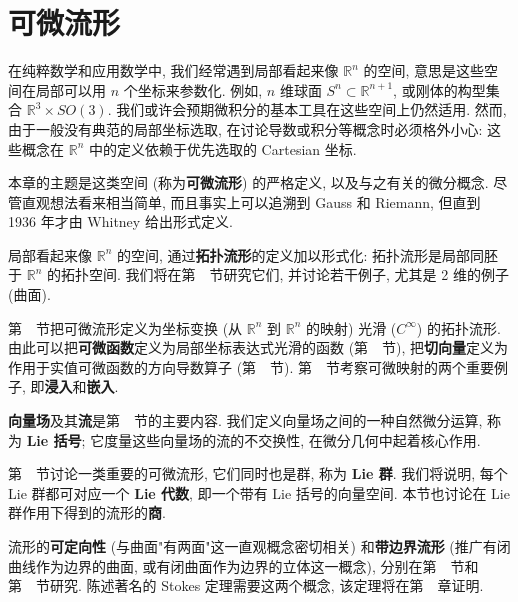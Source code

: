 \chapter{可微流形}\label{chap:differentiable-manifolds}
\begingroup
\renewcommand{\thefootnote}{}
\endgroup

在纯粹数学和应用数学中, 我们经常遇到局部看起来像 $\mathbb{R}^n$ 的空间, 意思是这些空间在局部可以用 $n$ 个坐标来参数化. 例如, $n$ 维球面 $S^n\subset\mathbb{R}^{n+1}$, 或刚体的构型集合 $\mathbb{R}^3\times SO(3)$. 我们或许会预期微积分的基本工具在这些空间上仍然适用. 然而, 由于一般没有典范的局部坐标选取, 在讨论导数或积分等概念时必须格外小心: 这些概念在 $\mathbb{R}^n$ 中的定义依赖于优先选取的 Cartesian 坐标.

本章的主题是这类空间 (称为\textbf{可微流形}) 的严格定义, 以及与之有关的微分概念. 尽管直观想法看来相当简单, 而且事实上可以追溯到 Gauss 和 Riemann, 但直到 1936 年才由 Whitney 给出形式定义.

局部看起来像 $\mathbb{R}^n$ 的空间, 通过\textbf{拓扑流形}的定义加以形式化: 拓扑流形是局部同胚于 $\mathbb{R}^n$ 的拓扑空间. 我们将在第~~节研究它们, 并讨论若干例子, 尤其是 2 维的例子 (曲面).

第~~节把可微流形定义为坐标变换 (从 $\mathbb{R}^n$ 到 $\mathbb{R}^n$ 的映射) 光滑 ($C^\infty$) 的拓扑流形. 由此可以把\textbf{可微函数}定义为局部坐标表达式光滑的函数 (第~~节), 把\textbf{切向量}定义为作用于实值可微函数的方向导数算子 (第~~节). 第~~节考察可微映射的两个重要例子, 即\textbf{浸入}和\textbf{嵌入}.

\textbf{向量场}及其\textbf{流}是第~~节的主要内容. 我们定义向量场之间的一种自然微分运算, 称为 \textbf{Lie 括号}; 它度量这些向量场的流的不交换性, 在微分几何中起着核心作用.

第~~节讨论一类重要的可微流形, 它们同时也是群, 称为 \textbf{Lie 群}. 我们将说明, 每个 Lie 群都可对应一个 \textbf{Lie 代数}, 即一个带有 Lie 括号的向量空间. 本节也讨论在 Lie 群作用下得到的流形的\textbf{商}.

流形的\textbf{可定向性} (与曲面"有两面"这一直观概念密切相关) 和\textbf{带边界流形} (推广有闭曲线作为边界的曲面, 或有闭曲面作为边界的立体这一概念), 分别在第~~节和第~~节研究. 陈述著名的 Stokes 定理需要这两个概念, 该定理将在第~~章证明.
